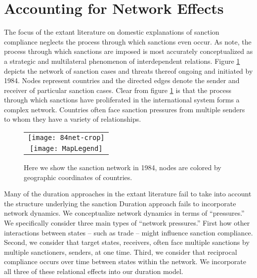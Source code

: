 \section*{Accounting for Network Effects}
\label{neteffects}

The focus of the extant literature on domestic explanations of sanction compliance neglects the process through which sanctions even occur. As \citet{cranmer2014reciprocity} note, the process through which sanctions are imposed is most accurately conceptualized as a strategic and multilateral phenomenon of interdependent relations. Figure \ref{fig:spaghetti} depicts the network of sanction cases and threats thereof ongoing and initiated by 1984. Nodes represent countries and the directed edges denote the sender and receiver of particular sanction cases. Clear from figure \ref{fig:spaghetti} is that the process through which sanctions have proliferated in the international system forms a complex network. Countries often face sanction pressures from multiple senders to whom they have a variety of relationships.

\begin{figure}[ht]
  \centering
  \begin{tabular}{c}
	  \texttt{[image: 84net-crop]} \\
	  \texttt{[image: MapLegend]}
  \end{tabular}
  \caption{Here we show the sanction network in 1984, nodes are colored by geographic coordinates of countries.}
  \label{fig:spaghetti}
\end{figure}
\FloatBarrier

Many of the duration approaches in the extant literature fail to take into account the structure underlying the sanction Duration approach fails to incorporate network dynamics. We conceptualize network dynamics in terms of ``pressures.'' We specifically consider three main types of ``network pressures.'' First how other interactions between states -- such as trade -- might influence sanction compliance. Second, we consider that target states, receivers, often face multiple sanctions by multiple sanctioners, senders, at one time. Third, we consider that reciprocal compliance occurs over time between states within the network. We incorporate all three of these relational effects into our duration model. 

